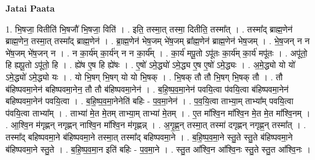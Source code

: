 \documentclass[17pt]{extarticle}
\begin{document}
\textbf{Jatai Paata} \newline

1. भि॒षजा॒ वितीति॑ भि॒षजौ॑ भि॒षजा॒ विति॑ । . इति॒ तस्मा॒त् तस्मा॒ दितीति॒ तस्मा᳚त् । . तस्मा᳚द् ब्राह्म॒णेन॑ ब्राह्म॒णेन॒ तस्मा॒त् तस्मा᳚द् ब्राह्म॒णेन॑ । . ब्रा॒ह्म॒णेन॑ भेष॒जम् भे॑ष॒जम् ब्रा᳚ह्म॒णेन॑ ब्राह्म॒णेन॑ भेष॒जम् । . भे॒ष॒जन् न न भे॑ष॒जम् भे॑ष॒जन् न । . न का॒र्य॑म् का॒र्य॑न् न न का॒र्य᳚म् । . का॒र्य॑ मपू॒तो ऽपू॑तः का॒र्य॑म् का॒र्य॑ मपू॑तः । . अपू॑तो॒ हि ह्यपू॒तो ऽपू॑तो॒ हि । . ह्ये॑ष ए॒ष हि ह्ये॑षः । . ए॒षो॑ ऽमे॒द्ध्यो॑ ऽमे॒द्ध्य ए॒ष ए॒षो॑ ऽमे॒द्ध्यः । . अ॒मे॒द्ध्यो यो यो॑ ऽमे॒द्ध्यो॑ ऽमे॒द्ध्यो यः । . यो भि॒षग् भि॒षग् यो यो भि॒षक् । . भि॒षक् तौ तौ भि॒षग् भि॒षक् तौ । . तौ ब॑हिष्पवमा॒नेन॑ बहिष्पवमा॒नेन॒ तौ तौ ब॑हिष्पवमा॒नेन॑ । . ब॒हि॒ष्प॒व॒मा॒नेन॑ पवयि॒त्वा प॑वयि॒त्वा ब॑हिष्पवमा॒नेन॑ बहिष्पवमा॒नेन॑ पवयि॒त्वा । . ब॒हि॒ष्प॒व॒मा॒नेनेति॑ बहिः - प॒व॒मा॒नेन॑ । . प॒व॒यि॒त्वा ताभ्या॒म् ताभ्या᳚म् पवयि॒त्वा प॑वयि॒त्वा ताभ्या᳚म् । . ताभ्या॑ मे॒त मे॒तम् ताभ्या॒म् ताभ्या॑ मे॒तम् । . ए॒त मा᳚श्वि॒न मा᳚श्वि॒न मे॒त मे॒त मा᳚श्वि॒नम् । . आ॒श्वि॒न म॑गृह्णन् नगृह्णन् नाश्वि॒न मा᳚श्वि॒न म॑गृह्णन्न् । . अ॒गृ॒ह्ण॒न् तस्मा॒त् तस्मा॑ दगृह्णन् नगृह्ण॒न् तस्मा᳚त् । . तस्मा᳚द् बहिष्पवमा॒ने ब॑हिष्पवमा॒ने तस्मा॒त् तस्मा᳚द् बहिष्पवमा॒ने । . ब॒हि॒ष्प॒व॒मा॒ने स्तु॒ते स्तु॒ते ब॑हिष्पवमा॒ने ब॑हिष्पवमा॒ने स्तु॒ते । . ब॒हि॒ष्प॒व॒मा॒न इति॑ बहिः - प॒व॒मा॒ने । . स्तु॒त आ᳚श्वि॒न आ᳚श्वि॒नः स्तु॒ते स्तु॒त आ᳚श्वि॒नः । \newline
\end{document}
